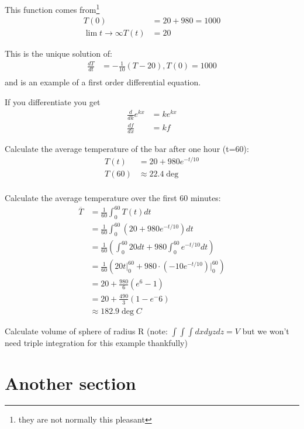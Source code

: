 This function comes from\footnote{they are not normally this pleasant}
\begin{align}
  T(0) &= 20 + 980 = 1000 \\
  \lim{t \to \infty} T(t) &= 20
\end{align}

This is the unique solution of:
\begin{align}
  \frac{dT}{dt} &= -\frac{1}{10}(T-20), T(0) = 1000 \\
\end{align}
and is an example of a first order differential equation.

If you differentiate you get
\begin{align}
  \frac{d}{dk} e^{kx} &= ke^{kx} \\
  \frac{df}{dx} &= kf
\end{align}

Calculate the average temperature of the bar after one hour (t=60):
\begin{align}
  T(t) &= 20 + 980e^{-t/10} \\
  T(60) &\approx 22.4\deg \\
\end{align}

Calculate the average temperature over the first 60 minutes:
\begin{align}
  \overline{T}
  &= \frac{1}{60} \int_0^60 T(t) dt \\
  &= \frac{1}{60} \int_0^60 (20+980e^{-t/10}) dt \\
  &= \frac{1}{60} \left(\int_0^60 20 dt + 980 \int_0^60 e^{-t/10} dt \right) \\
  &= \frac{1}{60} \left( 20t|_0^60 + 980\cdot(-10e^{-t/10})\rvert_0^60 \right) \\
  &= 20 + \frac{980}{6}(e^6 -1) \\
  &= 20 + \frac{490}{3}(1 - e^-6) \\
  &\approx 182.9 \deg C
\end{align}

Calculate volume of sphere of radius R
(note: $\int\int\int dxdyzdz = V$ but we won't need triple integration for this
example thankfully)


\section{Another section}

